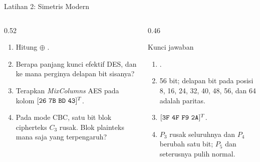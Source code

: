 \documentclass[aspectratio=169,11pt]{beamer}
\begin{document}
\begin{frame}{Latihan 2: Simetris Modern}
    \scriptsize
    \begin{columns}[T,onlytextwidth]
        \begin{column}{0.52\textwidth}
            \begin{enumerate}
                \setlength{\itemsep}{4pt}
                \item Hitung  $\oplus$ .
                \item Berapa panjang kunci efektif DES, dan ke mana perginya
                      delapan bit sisanya?
                \item Terapkan \textit{MixColumns} AES pada kolom
                      $[\code{26}\ \code{7B}\ \code{BD}\ \code{43}]^{T}$.
                \item Pada mode CBC, satu bit blok cipherteks $C_3$ rusak.
                      Blok plainteks mana saja yang terpengaruh?
            \end{enumerate}
        \end{column}
        \begin{column}{0.46\textwidth}
            \begin{block}{Kunci jawaban}
                \begin{enumerate}
                    \setlength{\itemsep}{3pt}
                    \item {}.
                    \item 56 bit; delapan bit pada posisi 8, 16, 24, 32, 40,
                          48, 56, dan 64 adalah paritas.
                    \item $[\code{3F}\ \code{4F}\ \code{F9}\ \code{2A}]^{T}$.
                    \item $P_3$ rusak seluruhnya dan $P_4$ berubah satu bit;
                          $P_5$ dan seterusnya pulih normal.
                \end{enumerate}
            \end{block}
        \end{column}
    \end{columns}
\end{frame}
\end{document}
